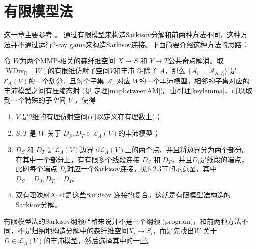 \chapter{有限模型法}\label{thirdmethod}
这一章主要参考 \cite{haconSarkisovProgram2012}。 通过有限模型来构造Sarkisov分解和前两种方法不同，这种方法并不通过运行2-ray game来构造Sarkisov连接。下面简要介绍这种方法的思路：

令 $W$为两个MMP-相关的森纤维空间 $X\to S$ 和 $Y\to T$公共奇点解消。取 $\operatorname{WDiv}_{\mathbb{R}}(W)$的有限维仿射子空间$V$和丰沛 $\mathbb{Q}$-除子 $A$，那么 $\{\mathcal{A}_{i} =\mathcal{A}_{A,f_{i}}\} $ 是 $\mathcal{E}_{A}(V)$的一个划分，且每个子集 $\mathcal{A}_{i}$ 对应 $W$的一个丰沛模型，相邻的子集对应的丰沛模型之间有压缩态射 (见 定理\ref{mapbetweenAM})。由引理\ref{keylemma}，可以取到一个特殊的子空间 $V$ ，使得 
\begin{enumerate}
  \item $V$ 是2维的有理仿射空间(可以定义在有理数上)； 
  \item $S,T$ 是 $W$ 关于 $D_{S},D_{T} \in \mathcal{L}_{A}(V) $的丰沛模型；
  \item $D_{S}$ 和 $D_{T}$ 是$\mathcal{L}_{A}(V)$边界 $\partial \mathcal{L}_{A}(V)$上的两个点，并且将边界分为两个部分。在其中一个部分上，有有限多个线段连接 $D_{S}$ 和 $D_{T}$，并且$D_{i}$是线段的端点，此时每个端点 $ D_{i}$对应一个Sarkisov连接。见6.2.3节的示意图，其中$D_S=D_0,D_T=D_1$。
  \item 双有理映射$X\dashrightarrow Y$是这些Sarkisov 连接的复合。这就是有限模型法构造的Sarkisov分解。
\end{enumerate}
\begin{remark}
  有限模型法的Sarkisov纲领严格来说并不是一个纲领 (program)，和前两种方法不同，不是归纳地构造分解中的森纤维空间$X_{i}\to S_{i}$，而是先找出$W$ 关于$D \in \mathcal{L}_{A}(V)$的丰沛模型，然后选择其中的一些。
\end{remark}


